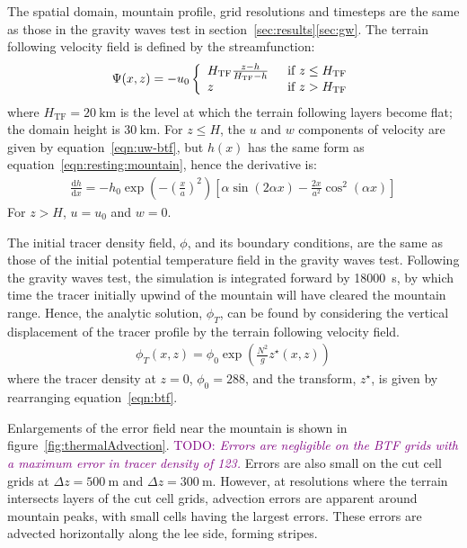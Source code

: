 \documentclass{ametsoc}
\newcommand{\TODO}[1]{\textcolor{purple}{TODO: \emph{#1}}}
\begin{document}
The spatial domain, mountain profile, grid resolutions and timesteps are the same as those in the gravity waves test in section~\ref{sec:results}\ref{sec:gw}.  The terrain following velocity field is defined by the streamfunction:
\begin{align}
	\Psi(x,z) = -u_0 \left\{ \begin{array}{l l}
			H_\mathrm{TF} \frac{z - h}{H_\mathrm{TF} - h} & \enskip \text{if $z \leq H_\mathrm{TF}$} \\
			z & \enskip \text{if $z > H_\mathrm{TF}$}
	\end{array} \right.
\end{align}
where \(H_\mathrm{TF} = \SI{20}{\kilo\meter}\) is the level at which the terrain following layers become flat; the domain height is \(\SI{30}{\kilo\meter}\).
For $z \leq H$, the $u$ and $w$ components of velocity are given by equation~\ref{eqn:uw-btf}, but $h(x)$ has the same form as equation~\ref{eqn:resting:mountain}, hence the derivative is:
\begin{align}
	\frac{\mathrm{d} h}{\mathrm{d} x} = -h_0 \exp \left(- \left( \frac{x}{a} \right)^2 \right) \left[ \alpha \sin \left( 2 \alpha x \right) - \frac{2x}{a^2} \cos^2\left( \alpha x \right) \right]
\end{align}
For $z > H$, $u = u_0$ and $w = 0$.

The initial tracer density field, \(\phi\), and its boundary conditions, are the same as those of the initial potential temperature field in the gravity waves test.
Following the gravity waves test, the simulation is integrated forward by \SI{18000}{\second}, by which time the tracer initially upwind of the mountain will have cleared the mountain range.
Hence, the analytic solution, $\phi_T$, can be found by considering the vertical displacement of the tracer profile by the terrain following velocity field.
\begin{align}
	\phi_T(x, z) = \phi_0 \exp \left( \frac{N^2}{g} z^\star(x, z) \right) 
\end{align}
where the tracer density at $z = 0$, $\phi_0 = 288$, and the transform, $z^\star$, is given by rearranging equation~\ref{eqn:btf}.

Enlargements of the error field near the mountain is shown in figure~\ref{fig:thermalAdvection}.
\TODO{Errors are negligible on the BTF grids with a maximum error in tracer density of \num{123}.}
Errors are also small on the cut cell grids at $\Delta z = \SI{500}{\meter}$ and $\Delta z = \SI{300}{\meter}$.  However, at resolutions where the terrain intersects layers of the cut cell grids, advection errors are apparent around mountain peaks, with small cells having the largest errors.  These errors are advected horizontally along the lee side, forming stripes.
\end{document}
